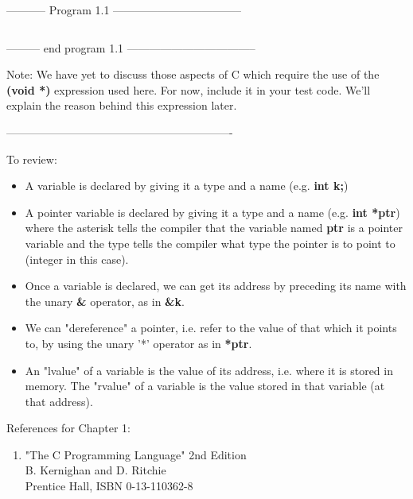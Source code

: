-----------  Program 1.1  -----------------------------------
\inputminted[breaklines]{c}{../src/ch1-1.c}
--------- end program 1.1 -----------------------------------

Note: We have yet to discuss those aspects of C which require the use of
the \textbf{(void *)} expression used here. For now, include it in your
test code. We'll explain the reason behind this expression later.

-------------------------------------------------------------

To review:

\begin{itemize}
\tightlist
\item
  A variable is declared by giving it a type and a name (e.g.
  \textbf{int k;})
\item
  A pointer variable is declared by giving it a type and a name (e.g.
  \textbf{int *ptr}) where the asterisk tells the compiler that the
  variable named \textbf{ptr} is a pointer variable and the type tells
  the compiler what type the pointer is to point to (integer in this
  case).
\item
  Once a variable is declared, we can get its address by preceding its
  name with the unary \textbf{\&} operator, as in \textbf{\&k}.
\item
  We can "dereference" a pointer, i.e. refer to the value of that which
  it points to, by using the unary '*' operator as in \textbf{*ptr}.
\item
  An "lvalue" of a variable is the value of its address, i.e. where it
  is stored in memory. The "rvalue" of a variable is the value stored in
  that variable (at that address).
\end{itemize}

References for Chapter 1:

\begin{enumerate}
\tightlist
\item
  "The C Programming Language" 2nd Edition\\
  B. Kernighan and D. Ritchie\\
  Prentice Hall, ISBN 0-13-110362-8\\
\end{enumerate}

\begin{comment}
\href{ch2x.htm}{Chapter 2: Pointer Types and Arrays.}

\href{pointers.htm}{Back to Table of Contents}
\end{comment}
